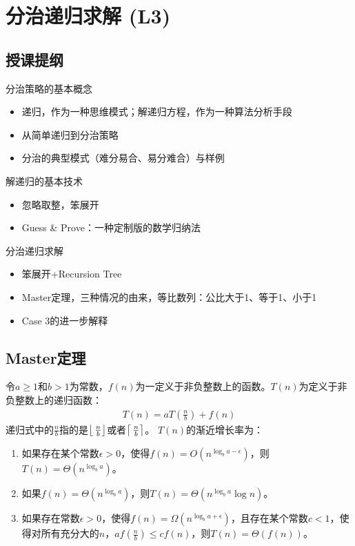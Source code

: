 \chapter{分治递归求解 (L3)}

\section*{授课提纲}

\nid 分治策略的基本概念
\begin{itemize}
    \item 递归，作为一种思维模式；解递归方程，作为一种算法分析手段
    \item 从简单递归到分治策略
    \item 分治的典型模式（难分易合、易分难合）与样例
\end{itemize}

\nid 解递归的基本技术
\begin{itemize}
    \item 忽略取整，笨展开
    \item Guess \& Prove：一种定制版的数学归纳法
\end{itemize}

\nid 分治递归求解
\begin{itemize}
    \item 笨展开+Recursion Tree
    \item Master定理，三种情况的由来，等比数列：公比大于1、等于1、小于1
    \item Case 3的进一步解释
\end{itemize}

\section{Master定理}

\begin{theorem}[Master定理]

令$a \geq 1$和$b>1$为常数，$f(n)$为一定义于非负整数上的函数。$T(n)$为定义于非负整数上的递归函数：
\begin{align}
    T(n) = aT\left(\frac{n}{b}\right) + f(n) \label{eqn:T(n)-1}
\end{align}
\noindent 递归式中的$\frac{n}{b}$指的是$\left \lfloor\,\frac{n}{b} \right \rfloor$或者$\left \lceil\,\frac{n}{b} \right \rceil$。
$T(n)$的渐近增长率为：

\begin{enumerate}[leftmargin=1em]
    \item 如果存在某个常数$\epsilon > 0$，使得$f(n) = O(n^{\log_b a - \epsilon})$，则$T(n) = \Theta(n^{\log_b a})$。
    \item 如果$f(n) = \Theta(n^{\log_b a})$，则$T(n) = \Theta(n^{\log_b a} \log n)$。
    \item 如果存在常数$\epsilon > 0$，使得$f(n) = \Omega(n^{\log_b a + \epsilon})$，且存在某个常数$c<1$，使得对所有充分大的$n$，$a f(\frac{n}{b}) \leq c f(n)$，则$T(n) = \Theta(f(n))$。
\end{enumerate}

\end{theorem}

